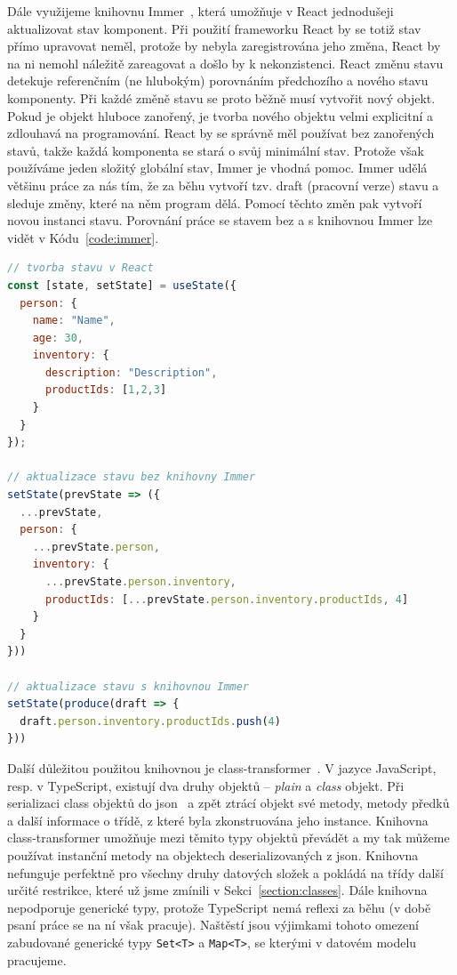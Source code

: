 Dále využijeme knihovnu Immer~\cite{michelweststrate_immer_2023}, která umožňuje v React jednodušeji aktualizovat stav komponent.
Při použití frameworku React by se totiž stav přímo upravovat neměl, protože by nebyla zaregistrována jeho změna, React by na ni nemohl náležitě zareagovat a došlo by k nekonzistenci.
React změnu stavu detekuje referenčním (ne hlubokým) porovnáním předchozího a nového stavu komponenty.
Při každé změně stavu se proto běžně musí vytvořit nový objekt.
Pokud je objekt hluboce zanořený, je tvorba nového objektu velmi explicitní a zdlouhavá na programování.
React by se správně měl používat bez zanořených stavů, takže každá komponenta se stará o svůj minimální stav.
Protože však používáme jeden složitý globální stav, Immer je vhodná pomoc.
Immer udělá většinu práce za nás tím, že za běhu vytvoří tzv. draft (pracovní verze) stavu a sleduje změny, které na něm program dělá.
Pomocí těchto změn pak vytvoří novou instanci stavu.
Porovnání práce se stavem bez a s knihovnou Immer lze vidět v Kódu~\ref{code:immer}.

\begin{lstlisting}[language=JavaScript,float=htb,caption=Použití knihovny Immer,label=code:immer]
// tvorba stavu v React
const [state, setState] = useState({
  person: {
    name: "Name",
    age: 30,
    inventory: {
      description: "Description",
      productIds: [1,2,3]
    }
  }
});

// aktualizace stavu bez knihovny Immer
setState(prevState => ({
  ...prevState,
  person: {
    ...prevState.person,
    inventory: {
      ...prevState.person.inventory,
      productIds: [...prevState.person.inventory.productIds, 4]
    }
  }
}))

// aktualizace stavu s knihovnou Immer
setState(produce(draft => {
  draft.person.inventory.productIds.push(4)
}))
\end{lstlisting}

Další důležitou použitou knihovnou je class-transformer~\cite{attilaolah_classtransformer_2023}.
V jazyce JavaScript, resp. v TypeScript, existují dva druhy objektů -- \emph{plain} a \emph{class} objekt.
Při serializaci class objektů do \acrshort{json}~\cite{tc39group_jsondata_2017} a zpět ztrácí objekt své metody, metody předků a další informace o třídě, z které byla zkonstruována jeho instance.
Knihovna class-transformer umožňuje mezi těmito typy objektů převádět a my tak můžeme používat instanční metody na objektech deserializovaných z \acrshort{json}.
Knihovna nefunguje perfektně pro všechny druhy datových složek a pokládá na třídy další určité restrikce, které už jsme zmínili v Sekci~\ref{section:classes}.
Dále knihovna nepodporuje generické typy, protože TypeScript nemá reflexi za běhu (v době psaní práce se na ní však pracuje).
Naštěstí jsou výjimkami tohoto omezení zabudované generické typy \texttt{Set<T>} a \texttt{Map<T>}, se kterými v datovém modelu pracujeme.

